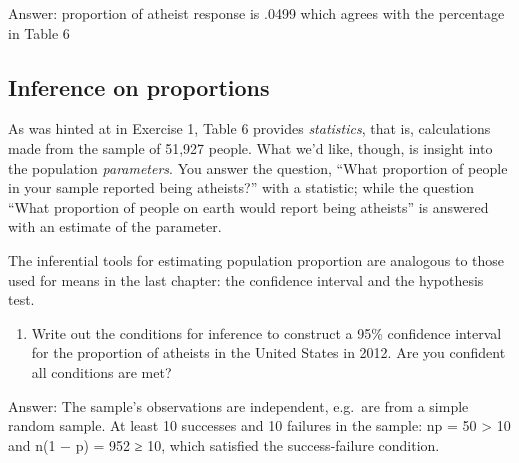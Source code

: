 \documentclass[
]{article}
\newenvironment{Shaded}{\begin{snugshade}}{\end{snugshade}}
\newcommand{\FunctionTok}[1]{\textcolor[rgb]{0.00,0.00,0.00}{#1}}
\newcommand{\NormalTok}[1]{#1}
\newcommand{\OtherTok}[1]{\textcolor[rgb]{0.56,0.35,0.01}{#1}}
\newcommand{\SpecialCharTok}[1]{\textcolor[rgb]{0.00,0.00,0.00}{#1}}
\newcommand{\StringTok}[1]{\textcolor[rgb]{0.31,0.60,0.02}{#1}}
\providecommand{\tightlist}{%
  \setlength{\itemsep}{0pt}\setlength{\parskip}{0pt}}
\begin{document}
\begin{Shaded}
\end{Shaded}

Answer: proportion of atheist response is .0499 which agrees with the
percentage in Table 6

\hypertarget{inference-on-proportions}{%
\subsection{Inference on proportions}\label{inference-on-proportions}}

As was hinted at in Exercise 1, Table 6 provides \emph{statistics}, that
is, calculations made from the sample of 51,927 people. What we'd like,
though, is insight into the population \emph{parameters}. You answer the
question, ``What proportion of people in your sample reported being
atheists?'' with a statistic; while the question ``What proportion of
people on earth would report being atheists'' is answered with an
estimate of the parameter.

The inferential tools for estimating population proportion are analogous
to those used for means in the last chapter: the confidence interval and
the hypothesis test.

\begin{enumerate}
\def\labelenumi{\arabic{enumi}.}
\setcounter{enumi}{4}
\tightlist
\item
  Write out the conditions for inference to construct a 95\% confidence
  interval for the proportion of atheists in the United States in 2012.
  Are you confident all conditions are met?
\end{enumerate}

Answer: The sample's observations are independent, e.g.~are from a
simple random sample. At least 10 successes and 10 failures in the
sample: np = 50 \textgreater{} 10 and n(1 − p) = 952 ≥ 10, which
satisfied the success-failure condition.
\end{document}
